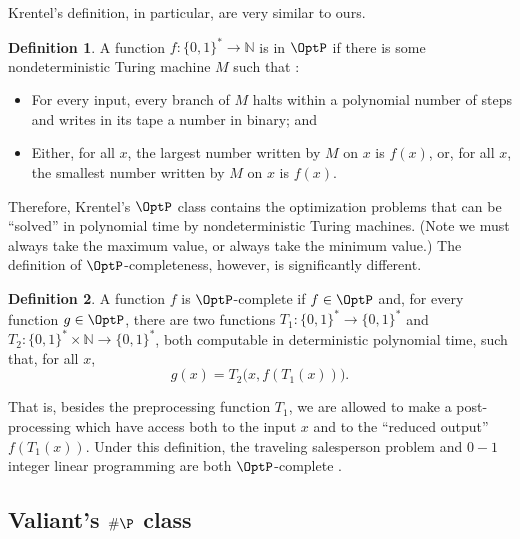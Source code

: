 \documentclass[12pt]{article}
\theoremstyle{definition}
\newtheorem{definition}{Definition}
\begin{document}
Krentel's definition, in particular,
are very similar to ours.

\begin{definition}
    A function $f: \{0, 1\}^* \to \mathbb N$ is in $\OptP$
    if there is some nondeterministic Turing machine $M$ such that
    \cite[p.~493]{Krentel1988}:
    \begin{itemize}
        \item For every input,
            every branch of $M$ halts within a polynomial number of steps
            and writes in its tape a number in binary; and
        \item Either,
            for all $x$, the largest number written by $M$ on $x$ is $f(x)$,
            or, for all $x$, the smallest number written by $M$ on $x$ is $f(x)$.
    \end{itemize}
\end{definition}

Therefore, Krentel's $\OptP$ class contains the optimization problems
that can be ``solved'' in polynomial time by nondeterministic Turing machines.
(Note we must always take the maximum value, or always take the minimum value.)
The definition of $\OptP$-completeness, however,
is significantly different.

\vspace{6pt}
\begin{definition}
    A function $f$ is $\OptP$-complete if $f \in \OptP$ and,
    for every function $g \in \OptP$,
    there are two functions $T_1 : \{0, 1\}^* \to \{0, 1\}^*$
    and $T_2 : \{0, 1\}^* \times \mathbb N \to \{0, 1\}^*$,
    both computable in deterministic polynomial time,
    such that, for all $x$,
    \begin{equation*}
        g(x) = T_2\big( x, f(T_1(x)) \big).
    \end{equation*}
\end{definition}

That is, besides the preprocessing function $T_1$,
we are allowed to make a post-processing which have access
both to the input $x$ and to the ``reduced output'' $f(T_1(x))$.
Under this definition,
the traveling salesperson problem and $0-1$ integer linear programming
are both $\OptP$-complete \cite[p~495]{Krentel1988}.

\subsection{Valiant's $\#\P$ class}
\label{sec:valiant}
\end{document}
